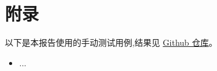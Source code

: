 \documentclass{article}
\begin{document}
\newpage
\section{附录}

\appendix

以下是本报告使用的手动测试用例,结果见 \href{https://github.com/QA-Team-lo/dbtest}{Github 仓库}。

\begin{itemize}
    \item ...
\end{itemize}

\end{document}
